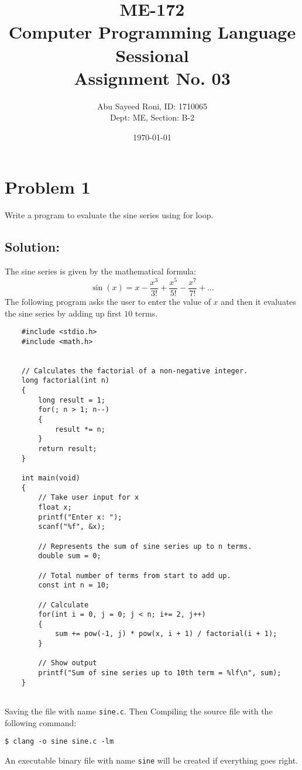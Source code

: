 \documentclass[12pt, letterpaper]{report}
\title{ME-172\\Computer Programming Language Sessional\\Assignment No. 03}
\author{Abu Sayeed Roni, ID: 1710065\\Dept: ME, Section: B-2}
\date{\today}
\begin{document}
\maketitle

\section*{Problem 1}
{\large Write a program to evaluate the sine series using for loop.}

\subsection*{Solution:}
The sine series is given by the mathematical formula:
\begin{displaymath}
\sin (x) = x - \frac{x^3}{3!} + \frac{x^5}{5!} - \frac{x^7}{7!} + ... 
\end{displaymath}
The following program asks the user to enter the value of $x$ and then it evaluates the sine series by adding up first $10$ terms.
\begin{verbatim}
    #include <stdio.h>
    #include <math.h>


    // Calculates the factorial of a non-negative integer.
    long factorial(int n)
    {
        long result = 1;
        for(; n > 1; n--)
        {
            result *= n;
        }
        return result;
    }

    int main(void)
    {
        // Take user input for x
        float x;
        printf("Enter x: ");
        scanf("%f", &x);

        // Represents the sum of sine series up to n terms.
        double sum = 0;

        // Total number of terms from start to add up.
        const int n = 10;

        // Calculate
        for(int i = 0, j = 0; j < n; i+= 2, j++)
        {
            sum += pow(-1, j) * pow(x, i + 1) / factorial(i + 1);
        }

        // Show output
        printf("Sum of sine series up to 10th term = %lf\n", sum);
    }


\end{verbatim}
Saving the file with name \texttt{sine.c}. Then Compiling the source file with the following command:

\begin{verbatim}
$ clang -o sine sine.c -lm
\end{verbatim}
An executable binary file with name \texttt{sine} will be created if everything goes right.
\end{document}
